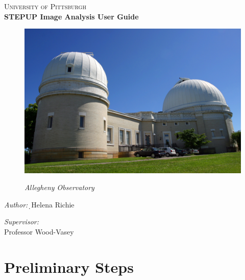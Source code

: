 \documentclass[11pt]{report}
\begin{document}
\begin{titlepage}
\begin{center}
\textsc{\LARGE University of Pittsburgh}\\[1.5cm]
{\huge \bfseries STEPUP Image Analysis User Guide\\[0.4cm] }

\begin{figure}[!h]
\begin{center}
\includegraphics[totalheight=.5\textheight]{Title.jpg}
\end{center}
\begin{center}
\emph{Allegheny Observatory}
\end{center}
\end{figure}

\vfill
\begin{minipage}{0.4\textwidth}
\begin{flushleft}\large
\emph{Author:}\d\
Helena Richie
\end{flushleft}
\end{minipage}
\begin{minipage}{0.4\textwidth}
\begin{flushright} \large
\emph{Supervisor:} \\
Professor Wood-Vasey
\end{flushright}
\end{minipage}

\end{center}
\end{titlepage}
\tableofcontents
\chapter{Preliminary Steps}
\end{document}
